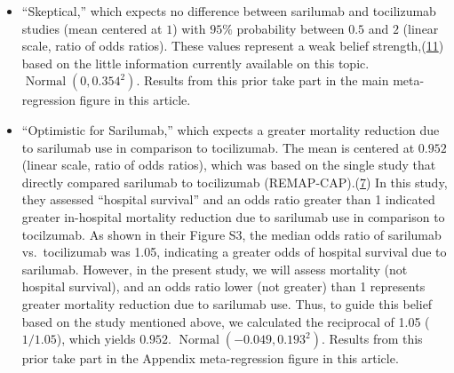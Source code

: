 \documentclass[
  12pt,
]{article}
\begin{document}
\begin{itemize}
\item
  ``Skeptical,'' which expects no difference between sarilumab and
  tocilizumab studies (mean centered at \(1\)) with \(95\%\) probability
  between \(0.5\) and \(2\) (linear scale, ratio of odds ratios). These
  values represent a weak belief
  strength,(\protect\hyperlink{ref-zampieri2021}{11}) based on the
  little information currently available on this topic.
  \(\operatorname{Normal}(0, 0.354^2)\). Results from this prior take
  part in the main meta-regression figure in this article.
\item
  ``Optimistic for Sarilumab,'' which expects a greater mortality
  reduction due to sarilumab use in comparison to tocilizumab. The mean
  is centered at \(0.952\) (linear scale, ratio of odds ratios), which
  was based on the single study that directly compared sarilumab to
  tocilizumab (REMAP-CAP).(\protect\hyperlink{ref-zotero-3144}{7}) In
  this study, they assessed ``hospital survival'' and an odds ratio
  greater than 1 indicated greater in-hospital mortality reduction due
  to sarilumab use in comparison to tocilzumab. As shown in their Figure
  S3, the median odds ratio of sarilumab vs.~tocilizumab was 1.05,
  indicating a greater odds of hospital survival due to sarilumab.
  However, in the present study, we will assess mortality (not hospital
  survival), and an odds ratio lower (not greater) than 1 represents
  greater mortality reduction due to sarilumab use. Thus, to guide this
  belief based on the study mentioned above, we calculated the
  reciprocal of 1.05 (\(1/1.05\)), which yields \(0.952\).
  \(\operatorname{Normal}(-0.049, 0.193^2)\). Results from this prior
  take part in the Appendix meta-regression figure in this article.


\end{itemize}
\end{document}
